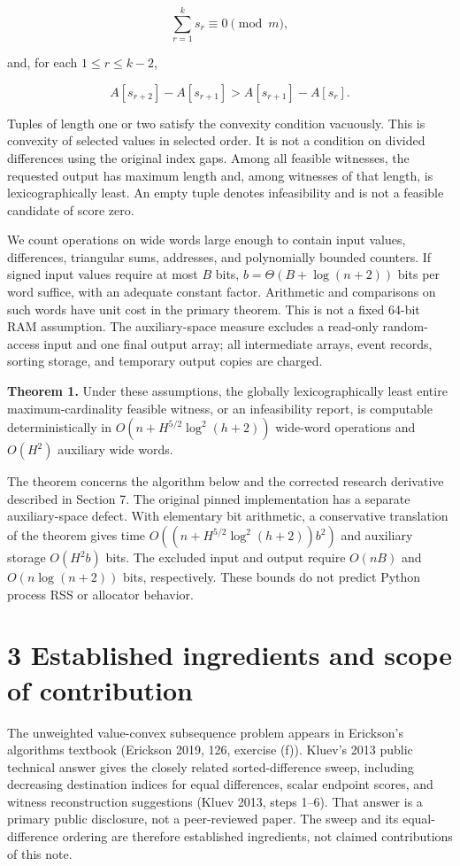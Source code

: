 \documentclass[
  11pt,
  letterpaper,
]{article}
\begin{document}
\[\sum_{r=1}^k s_r\equiv0\pmod m,\]

and, for each \(1\leq r\leq k-2\),

\[A[s_{r+2}]-A[s_{r+1}]>A[s_{r+1}]-A[s_r].\]

Tuples of length one or two satisfy the convexity condition vacuously.
This is convexity of selected values in selected order. It is not a
condition on divided differences using the original index gaps. Among
all feasible witnesses, the requested output has maximum length and,
among witnesses of that length, is lexicographically least. An empty
tuple denotes infeasibility and is not a feasible candidate of score
zero.

We count operations on wide words large enough to contain input values,
differences, triangular sums, addresses, and polynomially bounded
counters. If signed input values require at most \(B\) bits,
\(b=\Theta(B+\log(n+2))\) bits per word suffice, with an adequate
constant factor. Arithmetic and comparisons on such words have unit cost
in the primary theorem. This is not a fixed 64-bit RAM assumption. The
auxiliary-space measure excludes a read-only random-access input and one
final output array; all intermediate arrays, event records, sorting
storage, and temporary output copies are charged.

\textbf{Theorem 1.} Under these assumptions, the globally
lexicographically least entire maximum-cardinality feasible witness, or
an infeasibility report, is computable deterministically in
\(O(n+H^{5/2}\log^2(h+2))\) wide-word operations and \(O(H^2)\)
auxiliary wide words.

The theorem concerns the algorithm below and the corrected research
derivative described in Section 7. The original pinned implementation
has a separate auxiliary-space defect. With elementary bit arithmetic, a
conservative translation of the theorem gives time
\(O((n+H^{5/2}\log^2(h+2))b^2)\) and auxiliary storage \(O(H^2b)\) bits.
The excluded input and output require \(O(nB)\) and \(O(n\log(n+2))\)
bits, respectively. These bounds do not predict Python process RSS or
allocator behavior.

\hypertarget{established-ingredients-and-scope-of-contribution}{%
\section{3 Established ingredients and scope of
contribution}\label{established-ingredients-and-scope-of-contribution}}

The unweighted value-convex subsequence problem appears in Erickson's
algorithms textbook (Erickson 2019, 126, exercise (f)). Kluev's 2013
public technical answer gives the closely related sorted-difference
sweep, including decreasing destination indices for equal differences,
scalar endpoint scores, and witness reconstruction suggestions (Kluev
2013, steps 1--6). That answer is a primary public disclosure, not a
peer-reviewed paper. The sweep and its equal-difference ordering are
therefore established ingredients, not claimed contributions of this
note.
\end{document}
